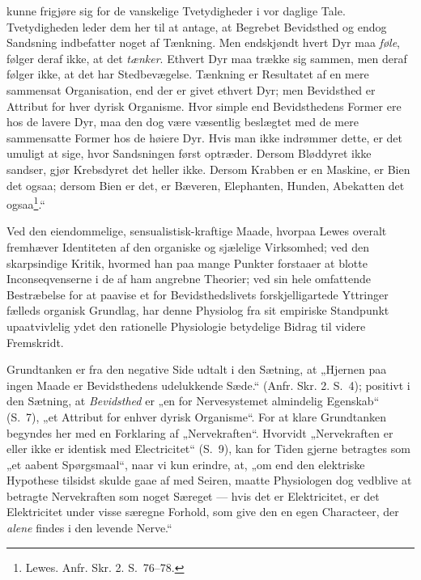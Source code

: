 \documentclass[11pt]{book}
\newcommand{\opage}[1]{\marginnote{\footnotesize\textit{[#1]}}}
\begin{document}
kunne frigjøre sig for de vanskelige Tvetydigheder i vor daglige Tale.
Tvetydigheden leder dem her til at antage, at Begrebet Bevidsthed og
endog Sandsning indbefatter noget af Tænkning. Men endskjøndt hvert
Dyr maa \emph{føle}, følger deraf ikke, at det \emph{tænker}. Ethvert
Dyr maa trække sig sammen, men deraf følger ikke, at det har
Stedbevægelse. Tænkning er Resultatet af en mere sammensat
Organisation,
\opage{365} \setcounter{footnote}{0}%
end der er givet ethvert Dyr; men Bevidsthed er Attribut for hver
dyrisk Organisme. Hvor simple end Bevidsthedens Former ere hos de
lavere Dyr, maa den dog være væsentlig beslægtet med de mere
sammensatte Former hos de høiere Dyr. Hvis man ikke indrømmer dette,
er det umuligt at sige, hvor Sandsningen først optræder. Dersom
Bløddyret ikke sandser, gjør Krebsdyret det heller ikke. Dersom
Krabben er en Maskine, er Bien det ogsaa; dersom Bien er det, er
Bæveren, Elephanten, Hunden, Abekatten det
ogsaa\footnote{%
Lewes. Anfr. Skr. 2. S.~76--78.
}.“

Ved den eiendommelige, sensualistisk-kraftige Maade, hvorpaa Lewes
overalt fremhæver Identiteten af den organiske og sjælelige
Virksomhed; ved den skarpsindige Kritik, hvormed han paa mange
Punkter forstaaer at blotte Inconseqvenserne i de af ham angrebne
Theorier; ved sin hele omfattende Bestræbelse for at paavise et for
Bevidsthedslivets forskjelligartede Yttringer fælleds organisk
Grundlag, har denne Physiolog fra sit empiriske Standpunkt
upaatvivlelig ydet den rationelle Physiologie betydelige Bidrag til
videre Fremskridt.

Grundtanken er fra den negative Side udtalt i den Sætning, at
„Hjernen paa ingen Maade er Bevidsthedens udelukkende Sæde.“ (Anfr.
Skr. 2. S.~4); positivt i den Sætning, at \emph{Bevidsthed} er „en for
Nervesystemet almindelig Egenskab“ (S.~7), „et Attribut for enhver
dyrisk Organisme“. For at klare Grundtanken begyndes her med en
Forklaring af „Nervekraften“. Hvorvidt „Nervekraften er eller ikke er
identisk med Electricitet“ (S.~9), kan for Tiden gjerne betragtes som
„et aabent Spørgsmaal“, naar vi kun erindre, at, „om end den elektriske
Hypothese tilsidst skulde gaae af med Seiren, maatte Physiologen dog
vedblive at betragte Nervekraften som noget Særeget --- hvis det er
Elektricitet, er det Elektricitet under visse særegne Forhold, som
give den en egen Characteer, der \emph{alene} findes i den levende
Nerve.“
\end{document}
